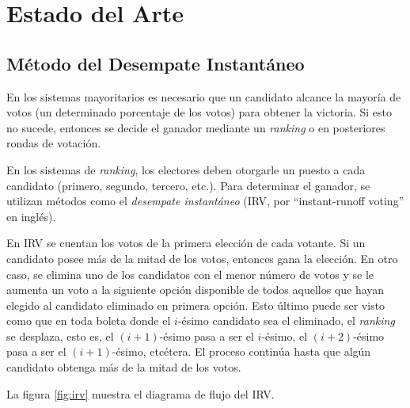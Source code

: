 \chapter{Estado del Arte}\label{chapter:state-of-the-art}

\section{M\'etodo del Desempate Instant\'aneo}\label{sec:irv}
En los sistemas mayoritarios es necesario que un candidato alcance la mayor\'ia de votos (un determinado porcentaje de los votos) para obtener la victoria. Si esto no sucede, entonces se decide el ganador mediante un \textit{ranking} o en posteriores rondas de votaci\'on.

En los sistemas de \textit{ranking}, los electores deben otorgarle un puesto a cada candidato (primero, segundo, tercero, etc.).  Para determinar el ganador, se utilizan m\'etodos como el \textit{desempate instant\'aneo} (IRV, por ``instant-runoff voting'' en ingl\'es). 

En IRV se cuentan los votos de la primera elecci\'on de cada votante. Si un candidato posee m\'as de la mitad de  los votos, entonces gana la elecci\'on. En otro caso, se elimina uno de los candidatos con el menor n\'umero de votos y se le aumenta un voto a la siguiente opci\'on disponible de todos aquellos que hayan elegido al candidato eliminado en primera opci\'on. Esto \'ultimo puede ser visto como que en toda boleta donde el $i$-\'esimo candidato sea el eliminado, el \textit{ranking} se desplaza, esto es, el $(i+1)$-\'esimo pasa a ser el $i$-\'esimo, el $(i+2)$-\'esimo pasa a ser el $(i+1)$-\'esimo, etc\'etera. El proceso contin\'ua hasta que alg\'un candidato obtenga m\'as de la mitad de los votos. 

La figura \ref{fig:irv} muestra el diagrama de flujo del IRV.

